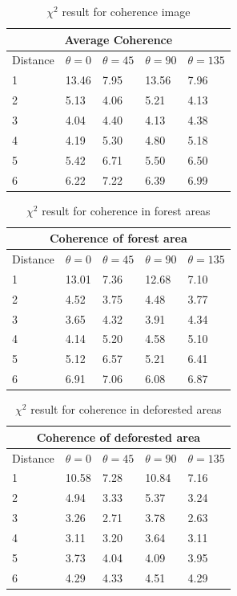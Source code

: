 \begin{table}[H]
    \begin{tabular}{ |p{2.5cm}||p{2.5cm}|p{2.5cm}|p{2.5cm}|p{2.5cm}| }
     \hline
     \multicolumn{5}{|c|}{Average Coherence} \\
     \hline
     Distance& $\theta=0$ & $\theta=45$ & $\theta=90$ & $\theta=135$\\
     \hline
        1 &13.46 &7.95 &13.56 &7.96\\
        2 &5.13 &4.06 &5.21 &4.13\\
        3 &4.04 &4.40 &4.13 &4.38\\
        4 &4.19 &5.30 &4.80 &5.18\\
        5 &5.42 &6.71 &5.50 &6.50\\
        6 &6.22 &7.22 &6.39 &6.99\\
     \hline
    
    \end{tabular}
     \caption{$\chi^2$ result for coherence image}
    \label{table:1}
\end{table}

\begin{table}[H]
    \begin{tabular}{ |p{2.5cm}||p{2.5cm}|p{2.5cm}|p{2.5cm}|p{2.5cm}| }
     \hline
     \multicolumn{5}{|c|}{Coherence of forest area} \\
     \hline
     Distance& $\theta=0$ & $\theta=45$ & $\theta=90$ & $\theta=135$\\
     \hline
        1 &13.01 &7.36 &12.68 &7.10\\
        2 &4.52 &3.75 &4.48 &3.77\\
        3 &3.65 &4.32 &3.91 &4.34\\
        4 &4.14 &5.20 &4.58 &5.10\\
        5 &5.12 &6.57 &5.21 &6.41\\
        6 &6.91 &7.06 &6.08 &6.87\\
     \hline
    \end{tabular}
     \caption{$\chi^2$ result for coherence in forest areas}
    \label{table:2}
\end{table}

\begin{table}[H]
    \begin{tabular}{ |p{2.5cm}||p{2.5cm}|p{2.5cm}|p{2.5cm}|p{2.5cm}| }
     \hline
     \multicolumn{5}{|c|}{Coherence of deforested area} \\
     \hline
     Distance& $\theta=0$ & $\theta=45$ & $\theta=90$ & $\theta=135$\\
     \hline
        1 &10.58 &7.28 &10.84 &7.16\\
        2 &4.94 &3.33 &5.37 &3.24\\
        3 &3.26 &2.71 &3.78 &2.63\\
        4 &3.11 &3.20 &3.64 &3.11\\
        5 &3.73 &4.04 &4.09 &3.95\\
        6 &4.29 &4.33 &4.51 &4.29\\
     \hline
    \end{tabular}
     \caption{$\chi^2$ result for coherence in deforested areas}
    \label{table:3}
\end{table}

